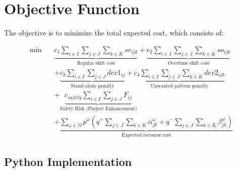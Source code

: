 \documentclass[12pt,a4paper]{article}
\begin{document}
\newpage

\section{Objective Function}

The objective is to minimize the total expected cost, which consists of:

\begin{tcolorbox}[title=Complete Objective Function]
\begin{equation}
\begin{aligned}
\min \quad & \underbrace{c_1 \sum_{i \in I} \sum_{j \in J} \sum_{k \in K} sr_{ijk}}_{\text{Regular shift cost}} 
+ \underbrace{c_2 \sum_{i \in I} \sum_{j \in J} \sum_{k \in K} so_{ijk}}_{\text{Overtime shift cost}} \\
& + \underbrace{c_3 \sum_{i \in I} \sum_{j \in J} dev1_{ij}}_{\text{Stand-alone penalty}}
+ \underbrace{c_4 \sum_{i \in I} \sum_{j \in J} \sum_{k \in K} dev2_{ijk}}_{\text{Unwanted pattern penalty}} \\
& + \underbrace{c_{safety} \sum_{i \in I} \sum_{j \in J} F_{ij}}_{\text{Safety Risk (Project Enhancement)}} \\
& + \underbrace{\sum_{\omega \in \Omega} p^\omega \left( q^+ \sum_{j \in J} \sum_{k \in K} \alpha_{jk}^\omega + q^- \sum_{j \in J} \sum_{k \in K} \beta_{jk}^\omega \right)}_{\text{Expected recourse cost}}
\end{aligned}
\end{equation}
\end{tcolorbox}

\subsection{Python Implementation}
\end{document}
